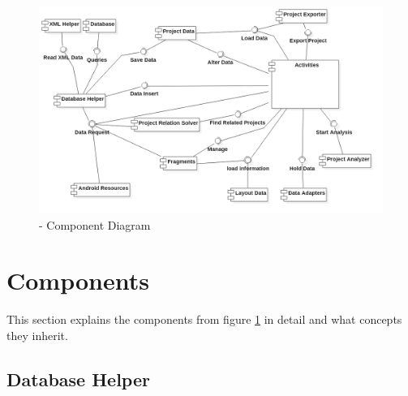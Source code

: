 \begin{figure}[h] 
	\centering 
	\includegraphics[width=14cm]{images/components.png} 
	\caption{- Component Diagram} 
	\label{fig:components}
\end{figure}

\section{Components}

This section explains the components from figure \ref{fig:components} in detail and what concepts they inherit.

\subsection{Database Helper}

